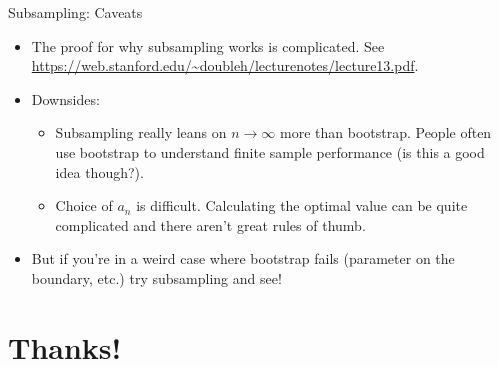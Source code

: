 \begin{frame}{Subsampling: Caveats}
\begin{itemize}
\item The proof for \alert{why} subsampling works is complicated. See \url{https://web.stanford.edu/~doubleh/lecturenotes/lecture13.pdf}.
\item Downsides:
\begin{itemize}
\item Subsampling really leans on $n \rightarrow \infty$ more than bootstrap. People often use bootstrap to understand finite sample performance (is this a good idea though?).
\item Choice of $a_n$ is difficult. Calculating the optimal value can be quite complicated and there aren't great rules of thumb.
\end{itemize}
\item But if you're in a weird case where bootstrap fails (parameter on the boundary, etc.) try subsampling and see!
\end{itemize}
\end{frame}


\section*{Thanks!}
